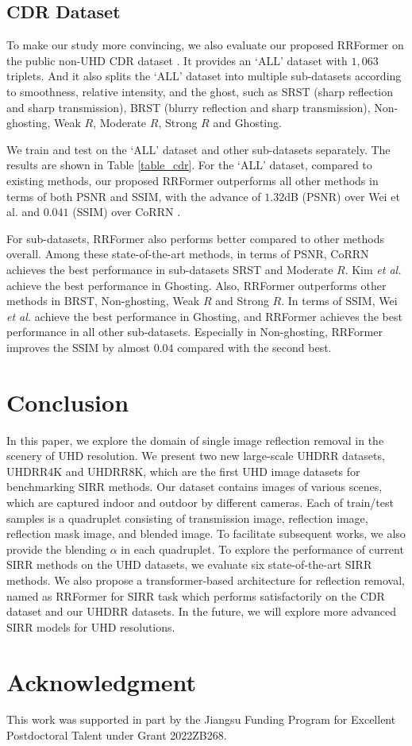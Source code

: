 \documentclass[10pt,journal]{IEEEtran}
\begin{document}
\subsection{CDR Dataset}
To make our study more convincing, we also evaluate our proposed RRFormer on the public non-UHD CDR dataset \cite{leiCategorizedReflectionRemoval2022}. 
It provides an `ALL' dataset with $1,063$ triplets. And it also splits the `ALL' dataset into multiple sub-datasets according to smoothness, relative intensity, and the ghost, such as SRST (sharp reflection and sharp transmission), BRST (blurry reflection and sharp transmission), Non-ghosting, Weak $R$, Moderate $R$, Strong $R$ and Ghosting. 

We train and test on the `ALL' dataset and other sub-datasets separately. The results are shown in Table \ref{table_cdr}. 
For the `ALL' dataset, compared to existing methods, our proposed RRFormer outperforms all other methods in terms of both PSNR and SSIM, with the advance of $1.32$dB (PSNR) over Wei et al. \cite{weiSingleImageReflection2019} and $0.041$ (SSIM) over CoRRN \cite{wanCoRRNCooperativeReflection2019}.

For sub-datasets, RRFormer also performs better compared to other methods overall. 
Among these state-of-the-art methods, in terms of PSNR, CoRRN \cite{wanCoRRNCooperativeReflection2019} achieves the best performance in sub-datasets SRST and Moderate $R$. Kim \textit{et al.} achieve the best performance in Ghosting. Also, RRFormer outperforms other methods in BRST, Non-ghosting, Weak $R$ and Strong $R$. In terms of SSIM, Wei \textit{et al.} achieve the best performance in Ghosting, and RRFormer achieves the best performance in all other sub-datasets. Especially in Non-ghosting, RRFormer improves the SSIM by almost $0.04$ compared with the second best.

\section{Conclusion}
In this paper, we explore the domain of single image reflection removal in the scenery of UHD resolution. 
%
We present two new large-scale UHDRR datasets, UHDRR4K and UHDRR8K, which are the first UHD image datasets for benchmarking SIRR methods. Our dataset contains images of various scenes, which are captured indoor and outdoor by different cameras. Each of train/test samples is a quadruplet consisting of transmission	image, reflection image, reflection mask image, and blended image. To facilitate subsequent works, we also provide the blending ${\alpha}$ in each quadruplet. 
To explore the performance of  current SIRR methods on the UHD datasets, we evaluate six state-of-the-art SIRR methods.
We also propose a transformer-based architecture for reflection removal, named as RRFormer for SIRR task which performs satisfactorily on the CDR dataset and our UHDRR datasets. 
In the future, we will explore more advanced SIRR models for UHD resolutions. 

\section*{Acknowledgment}
This work was supported in part by the Jiangsu Funding Program for Excellent Postdoctoral Talent under Grant 2022ZB268.


\end{document}
